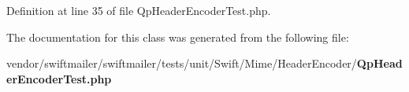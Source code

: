 Definition at line 35 of file Qp\+Header\+Encoder\+Test.\+php.



The documentation for this class was generated from the following file\+:\begin{DoxyCompactItemize}
\item 
vendor/swiftmailer/swiftmailer/tests/unit/\+Swift/\+Mime/\+Header\+Encoder/{\bf Qp\+Header\+Encoder\+Test.\+php}\end{DoxyCompactItemize}
